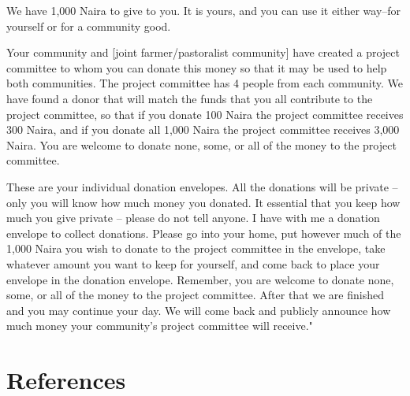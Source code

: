 \documentclass[11pt]{article}
\begin{document}
We have 1,000 Naira to give to you. It is yours, and you can use it
either way--for yourself or for a community good.

Your community and {[}joint farmer/pastoralist community{]} have created
a project committee to whom you can donate this money so that it may be
used to help both communities. The project committee has 4 people from
each community. We have found a donor that will match the funds that you
all contribute to the project committee, so that if you donate 100 Naira
the project committee receives 300 Naira, and if you donate all 1,000
Naira the project committee receives 3,000 Naira. You are welcome to
donate none, some, or all of the money to the project committee.

These are your individual donation envelopes. All the donations will be
private -- only you will know how much money you donated. It essential
that you keep how much you give private -- please do not tell anyone. I
have with me a donation envelope to collect donations. Please go into
your home, put however much of the 1,000 Naira you wish to donate to the
project committee in the envelope, take whatever amount you want to keep
for yourself, and come back to place your envelope in the donation
envelope. Remember, you are welcome to donate none, some, or all of the
money to the project committee. After that we are finished and you may
continue your day. We will come back and publicly announce how much
money your community's project committee will receive."

\hypertarget{references}{%
\section*{References}\label{references}}
\end{document}
